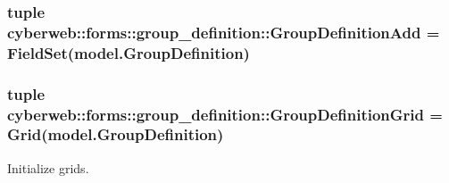 \hypertarget{namespacecyberweb_1_1forms_1_1group__definition_a94d308b7e2f934f20a77a3b519652455}{
\subsubsection[{\-Group\-Definition\-Add}]{\setlength{\rightskip}{0pt plus 5cm}tuple {\bf cyberweb\-::forms\-::group\-\_\-definition\-::\-Group\-Definition\-Add} = \-Field\-Set(model.\-Group\-Definition)}}\label{namespacecyberweb_1_1forms_1_1group__definition_a94d308b7e2f934f20a77a3b519652455}
\hypertarget{namespacecyberweb_1_1forms_1_1group__definition_a0e5abaf35b5804df4546e5fb5bd79868}{
\subsubsection[{\-Group\-Definition\-Grid}]{\setlength{\rightskip}{0pt plus 5cm}tuple {\bf cyberweb\-::forms\-::group\-\_\-definition\-::\-Group\-Definition\-Grid} = \-Grid(model.\-Group\-Definition)}}\label{namespacecyberweb_1_1forms_1_1group__definition_a0e5abaf35b5804df4546e5fb5bd79868}


\-Initialize grids. 

